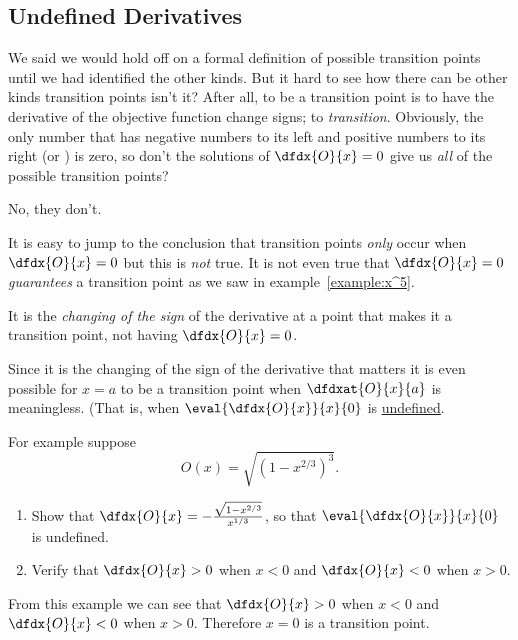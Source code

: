 \subsection{Undefined Derivatives}
\label{subsec:underl-deriv}
We said we would hold off on a formal definition of possible
transition points until we had identified the other kinds. But it hard
to see how there can be other kinds transition points isn't it? After
all, to be a
transition point is to have the derivative of the objective function
change signs; to \emph{transition}. Obviously, the only number that has negative numbers to
its left and positive numbers to its right (or ) is zero, so don't the solutions of $\dfdx{O}{x}=0$ give us
\emph{all} of the possible transition points?

No, they  don't.

It is easy to jump to the conclusion that transition points \emph{only} occur
when $\dfdx{O}{x}=0$ but this is \emph{not} true. It is not even true
that  $\dfdx{O}{x}=0$ \emph{guarantees} a transition point  as we
saw in example~\ref{example:x^5}.



  It is the \emph{changing of the sign} of the derivative at a point
  that makes it a transition point, not having $\dfdx{O}{x}=0$.



\begin{myexample}
  Since it is the changing of the sign of the derivative that matters it
  is even possible for $x=a$ to be a transition point when
  $\dfdxat{O}{x}{a}$ is meaningless. (That is, when
  $\eval{\dfdx{O}{x}}{x}{0}$ is \underline{undefined}.

  \begin{ProficiencyDrill-1line}
  For example suppose
  $$
  O(x) = \sqrt{(1-x^{2/3})^{3}}.
  $$
  \begin{enumerate}[label={\bf{}(\alph*)}]
  \item Show that $\dfdx{O}{x}=-\frac{\sqrt{1-x^{2/3}}}{x^{1/3}}$, so
    that   $\eval{\dfdx{O}{x}}{x}{0}$ is undefined.
  \item     Verify that $\dfdx{O}{x}>0$ when $x<0$ and
    $\dfdx{O}{x}<0$ when $x>0$.
  \end{enumerate}
  \end{ProficiencyDrill-1line}
    From this example we can see that $\dfdx{O}{x}>0$ when $x<0$ and
    $\dfdx{O}{x}<0$ when $x>0$. Therefore $x=0$ is a transition point.
\end{myexample}


